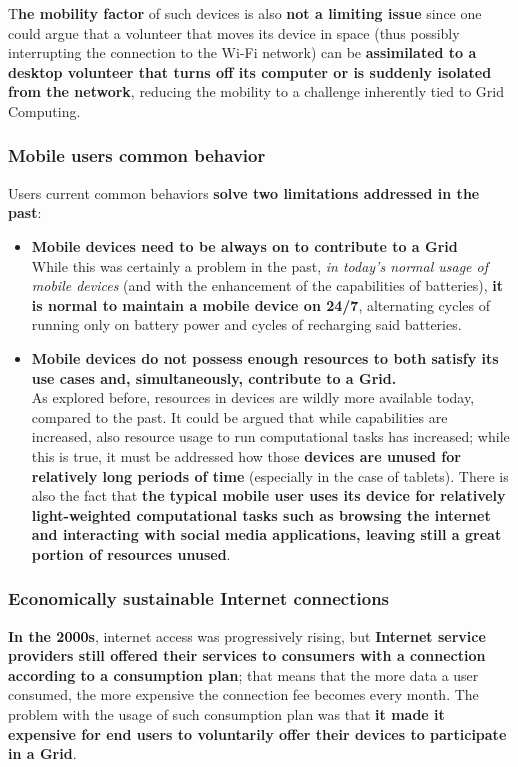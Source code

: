 T\textbf{he mobility factor} of such devices is also \textbf{not a limiting issue} since one could argue that a volunteer that moves its device in space (thus possibly interrupting the connection to the Wi-Fi network) can be \textbf{assimilated to a desktop volunteer that turns off its computer or is suddenly isolated from the network}, reducing the mobility to a challenge inherently tied to Grid Computing.

\subsubsection{Mobile users common behavior}
Users current common behaviors \textbf{solve two limitations addressed in the past}:
\begin{itemize}
    \item \textbf{Mobile devices need to be always on to contribute to a Grid}\\
    While this was certainly a problem in the past, \textit{in today's normal usage of mobile devices} (and with the enhancement of the capabilities of batteries), \textbf{it is normal to maintain a mobile device on 24/7}, alternating cycles of running only on battery power and cycles of recharging said batteries.
    \vspace{20mm}
    \item \textbf{Mobile devices do not possess enough resources to both satisfy its use cases and, simultaneously, contribute to a Grid.}\\
    As explored before, resources in devices are wildly more available today, compared to the past. It could be argued that while capabilities are increased, also resource usage to run computational tasks has increased; while this is true, it must be addressed how those \textbf{devices are unused for relatively long periods of time} (especially in the case of tablets). There is also the fact that \textbf{the typical mobile user uses its device for relatively light-weighted computational tasks such as browsing the internet and interacting with social media applications, leaving still a great portion of resources unused}.
\end{itemize}

\subsubsection{Economically sustainable Internet connections}
\textbf{In the 2000s}, internet access was progressively rising, but \textbf{Internet service providers still offered their services to consumers with a connection according to a consumption plan}; that means that the more data a user consumed, the more expensive the connection fee becomes every month. The problem with the usage of such consumption plan was that \textbf{it made it expensive for end users to voluntarily offer their devices to participate in a Grid}.

